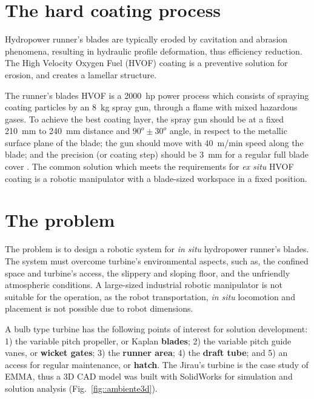 \section{The hard coating process}

Hydropower runner's blades are typically eroded by cavitation and abrasion
phenomena, resulting in hydraulic profile deformation, thus efficiency
reduction. The High Velocity Oxygen Fuel (HVOF) coating is a preventive
solution for erosion, and creates a lamellar structure. 

The runner's blades HVOF is a 2000~hp power process which consists of
spraying coating particles by an 8~kg spray gun, through a flame with mixed
hazardous gases. To achieve the best coating layer, the spray gun should be at
a fixed 210~mm to 240~mm distance and $90^o \pm 30^o$ angle, in respect to the
metallic surface plane of the blade; the gun should move with 40~m/min speed
along the blade; and the precision (or coating step) should be 3~mm for a
regular full blade cover \cite{li2002effect}. The
common solution which meets the requirements for \textit{ex situ} HVOF coating
is a robotic manipulator with a blade-sized workspace in a fixed position.

\section{The problem}\label{problem}

The problem is to design a robotic system for \textit{in situ}
hydropower runner's blades. The system must overcome turbine's environmental
aspects, such as, the confined space and turbine's access, the slippery and
sloping floor, and the unfriendly atmospheric conditions. A large-sized industrial
robotic manipulator is not suitable for the operation, as the robot
transportation, \textit{in situ} locomotion and placement is not possible due
to robot dimensions.

A bulb type turbine has the following points of interest for solution
development: 1) the variable pitch propeller, or Kaplan \textbf{blades}; 2) the
variable pitch guide vanes, or \textbf{wicket gates}; 3) the \textbf{runner
area}; 4) the \textbf{draft tube}; and 5) an access for regular
maintenance, or \textbf{hatch}. The Jirau's turbine is the case study of EMMA,
thus a 3D CAD model was built with SolidWorks\raisebox{1ex}{\textregistered}
for simulation and solution analysis (Fig.~\ref{fig::ambiente3d}).

